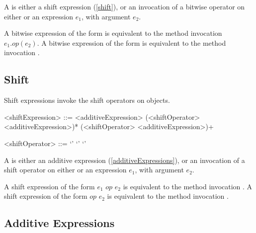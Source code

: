 \documentclass[makeidx]{article}
\begin{document}
\LMHash{}%
A  is either a shift expression (\ref{shift}), or an invocation of a bitwise operator on either \SUPER{} or an expression $e_1$, with argument $e_2$.

\LMHash{}%
A bitwise expression of the form  is equivalent to the method invocation $e_1.op(e_2)$.
A bitwise expression of the form  is equivalent to the method invocation .



\subsection{Shift}

\LMHash{}%
Shift expressions invoke the shift operators on objects.

\begin{grammar}
<shiftExpression> ::= \gnewline{}
  <additiveExpression> (<shiftOperator> <additiveExpression>)*
  \alt \SUPER{} (<shiftOperator> <additiveExpression>)+

<shiftOperator> ::= `\ltlt'
  \alt `\gtgt'
  \alt `\gtgtgt'
\end{grammar}

\LMHash{}%
A  is either an additive expression (\ref{additiveExpressions}), or an invocation of a shift operator on either \SUPER{} or an expression $e_1$, with argument $e_2$.

\LMHash{}%
A shift expression of the form $e_1$ $op$ $e_2$ is equivalent to the method invocation .
A shift expression of the form \SUPER{} $op$ $e_2$ is equivalent to the method invocation .



\subsection{Additive Expressions}
\end{document}

